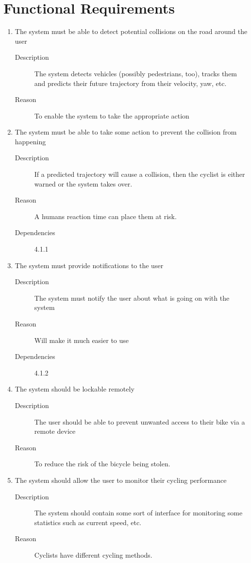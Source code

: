 \documentclass[a4paper]{report}
\begin{document}
\section{Functional Requirements}
\label{sec:func_req}
\begin{enumerate}[label=\ref*{sec:func_req}.\arabic*.,leftmargin=*]
\item The system must be able to detect potential collisions on the road around the user
\begin{description}
\item[Description] The system detects vehicles (possibly pedestrians, too), tracks them and predicts their future trajectory from their velocity, yaw, etc.
\item[Reason] To enable the system to take the appropriate action
\end{description}

\item The system must be able to take some action to prevent the collision from happening
\begin{description}
\item[Description] If a predicted trajectory will cause a collision, then the cyclist is either warned or the system takes over.
\item[Reason] A humans reaction time can place them at risk.
\item[Dependencies] 4.1.1
\end{description}

\item The system must provide notifications to the user
\begin{description}
\item[Description] The system must notify the user about what is going on with the system
\item[Reason] Will make it much easier to use
\item[Dependencies] 4.1.2
\end{description}

\item The system should be lockable remotely
\begin{description}
\item[Description] The user should be able to prevent unwanted access to their bike via a remote device
\item[Reason] To reduce the risk of the bicycle being stolen.
\end{description}

\item The system should allow the user to monitor their cycling performance
\begin{description}
\item[Description] The system should contain some sort of interface for monitoring some statistics such as current speed, etc.
\item[Reason] Cyclists have different cycling methods.
\end{description}


\end{enumerate}
\end{document}
